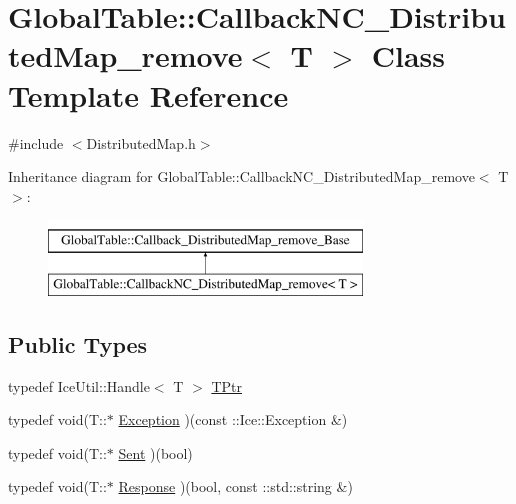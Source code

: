\hypertarget{class_global_table_1_1_callback_n_c___distributed_map__remove}{
\section{GlobalTable::CallbackNC\_\-DistributedMap\_\-remove$<$ T $>$ Class Template Reference}
\label{class_global_table_1_1_callback_n_c___distributed_map__remove}
}


{\ttfamily \#include $<$DistributedMap.h$>$}

Inheritance diagram for GlobalTable::CallbackNC\_\-DistributedMap\_\-remove$<$ T $>$:\begin{figure}[H]
\begin{center}
\leavevmode
\includegraphics[height=2cm]{class_global_table_1_1_callback_n_c___distributed_map__remove}
\end{center}
\end{figure}
\subsection*{Public Types}
\begin{DoxyCompactItemize}
\item 
typedef IceUtil::Handle$<$ T $>$ \hyperlink{class_global_table_1_1_callback_n_c___distributed_map__remove_a5ae7d6daca40ba4c93198ac3fef691ae}{TPtr}
\item 
typedef void(T::$\ast$ \hyperlink{class_global_table_1_1_callback_n_c___distributed_map__remove_a6af61b5cc432f624acfd6a7cbf2ace31}{Exception} )(const ::Ice::Exception \&)
\item 
typedef void(T::$\ast$ \hyperlink{class_global_table_1_1_callback_n_c___distributed_map__remove_afd84ad88b313577ef250caab113b43a3}{Sent} )(bool)
\item 
typedef void(T::$\ast$ \hyperlink{class_global_table_1_1_callback_n_c___distributed_map__remove_a7a067fa8583ce4e7507e4c0601f9800d}{Response} )(bool, const ::std::string \&)
\end{DoxyCompactItemize}

